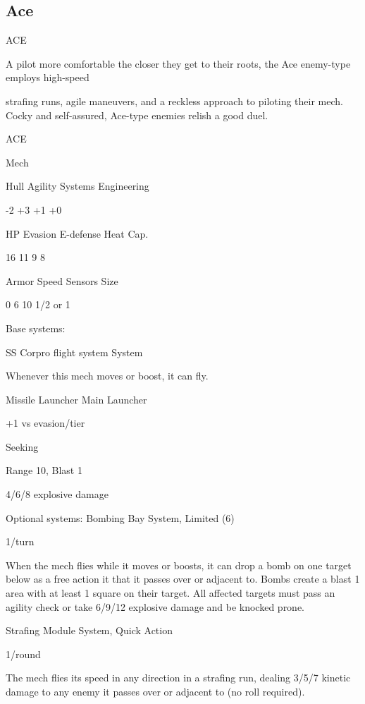 \subsection{Ace}
                                                  ACE

A pilot more comfortable the closer they get to their roots, the Ace enemy-type employs high-speed

strafing runs, agile maneuvers, and a reckless approach to piloting their mech. Cocky and self-assured,
Ace-type enemies relish a good duel.


 ACE

 Mech

 Hull       Agility     Systems       Engineering

 -2         +3          +1            +0

 HP         Evasion     E-defense     Heat Cap.

 16         11          9             8

 Armor      Speed       Sensors       Size

 0          6           10            1/2 or 1

Base systems:

SS Corpro flight system
System

Whenever this mech moves or boost, it can fly.


Missile Launcher
Main Launcher

+1 vs evasion/tier

Seeking

Range 10, Blast 1

4/6/8 explosive damage


Optional systems:
Bombing Bay
System, Limited (6)

1/turn

When the mech flies while it moves or boosts, it can drop a bomb on one target below as a free
action it that it passes over or adjacent to. Bombs create a blast 1 area with at least 1 square on
their target. All affected targets must pass an agility check or take 6/9/12 explosive damage and
be knocked prone.





Strafing Module
System, Quick Action

1/round

The mech flies its speed in any direction in a strafing run, dealing 3/5/7 kinetic damage to any
enemy it passes over or adjacent to (no roll required).


